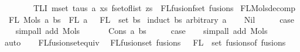 \begin{isabellebody}
\ \ \ \ \ \ \ \ TLI\ {\isacharparenleft}{\kern0pt}mset\ taus{\isacharparenright}{\kern0pt}\ a\ xs\ {\isacharparenleft}{\kern0pt}fset{\isacharunderscore}{\kern0pt}of{\isacharunderscore}{\kern0pt}list\ zs\ {\isacharbar}{\kern0pt}{\isasymunion}{\isacharbar}{\kern0pt}\ FLfusion{\isacharunderscore}{\kern0pt}fset\ fusions{\isacharparenright}{\kern0pt}{\isacharparenright}{\kern0pt}{\isachardoublequoteclose}\isanewline
\isanewline
\isanewline
\isanewline
\isanewline
\isanewline
{}\isamarkupfalse%
\ FL{\isacharunderscore}{\kern0pt}Mols{}{\isacharunderscore}{\kern0pt}decomp{\isacharcolon}{\kern0pt}\isanewline
\ \ {\isachardoublequoteopen}FL\ {\isacharparenleft}{\kern0pt}Mols{}\ a\ bs{\isacharparenright}{\kern0pt}\ {\isacharequal}{\kern0pt}\ FL\ a\ {\isasymunion}\ {\isasymUnion}\ {\isacharparenleft}{\kern0pt}FL\ {\isacharbackquote}{\kern0pt}\ set\ bs{\isacharparenright}{\kern0pt}{\isachardoublequoteclose}\isanewline
%
\isadelimproof
%
\endisadelimproof
%
\isatagproof
{}\isamarkupfalse%
\ {\isacharparenleft}{\kern0pt}induct\ bs\ arbitrary{\isacharcolon}{\kern0pt}\ a{\isacharparenright}{\kern0pt}\isanewline
\ \ \isamarkupfalse%
\ Nil\isanewline
\ \ \isamarkupfalse%
\ \isamarkupfalse%
\ {\isacharquery}{\kern0pt}case\isanewline
\ \ \isamarkupfalse%
\ {\isacharparenleft}{\kern0pt}simp{\isacharunderscore}{\kern0pt}all\ add{\isacharcolon}{\kern0pt}\ Mols{}{\isacharparenright}{\kern0pt}\isanewline
\ \ \isamarkupfalse%
\isanewline
{}\isamarkupfalse%
\isanewline
\ \ \isamarkupfalse%
\ {\isacharparenleft}{\kern0pt}Cons\ a\ bs{\isacharparenright}{\kern0pt}\isanewline
\ \ \isamarkupfalse%
\ \isamarkupfalse%
\ {\isacharquery}{\kern0pt}case\isanewline
\ \ \isamarkupfalse%
\ {\isacharparenleft}{\kern0pt}simp{\isacharunderscore}{\kern0pt}all\ add{\isacharcolon}{\kern0pt}\ Mols{}{\isacharparenright}{\kern0pt}\isanewline
\ \ \isamarkupfalse%
\ auto\isanewline
\ \ \isamarkupfalse%
\isanewline
{}\isamarkupfalse%
%
\endisatagproof
{\isafoldproof}%
%
\isadelimproof
\isanewline
%
\endisadelimproof
\isanewline
{}\isamarkupfalse%
\ FLfusion{\isacharunderscore}{\kern0pt}set{\isacharunderscore}{\kern0pt}equiv{\isacharcolon}{\kern0pt}\isanewline
\ \ {\isachardoublequoteopen}FLfusion{\isacharunderscore}{\kern0pt}set\ fusions\ {\isacharequal}{\kern0pt}\ {\isasymUnion}\ {\isacharparenleft}{\kern0pt}FL\ {\isacharbackquote}{\kern0pt}\ set\ {\isacharparenleft}{\kern0pt}fusions{\isacharunderscore}{\kern0pt}of\ fusions{\isacharparenright}{\kern0pt}{\isacharparenright}{\kern0pt}{\isachardoublequoteclose}\isanewline

\end{isabellebody}
